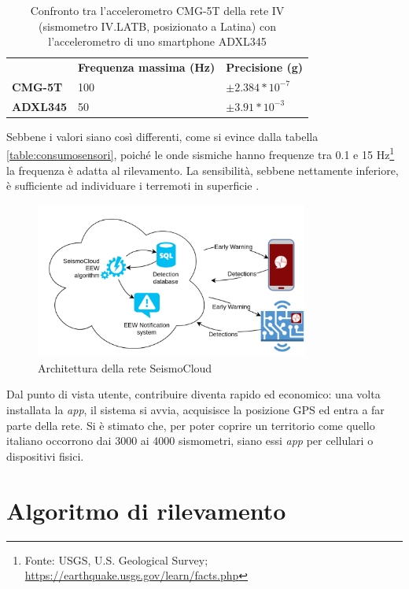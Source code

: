 \documentclass[a4paper,10pt]{memoir}
\begin{document}
\begin{table}[h]
\centering
\caption{Confronto tra l'accelerometro CMG-5T della rete IV (sismometro IV.LATB, posizionato a Latina) con l'accelerometro di uno smartphone ADXL345}
\label{table:datisensori}
\begin{tabular}{lll}
                    & \textbf{Frequenza massima (Hz)} & \textbf{Precisione (g)} \\
\textbf{CMG-5T} \cite{ivlatb} & 100 & $\pm 2.384 * 10^{-7}$ \\
\textbf{ADXL345} \cite{accelman}          & 50 & $\pm 3.91 * 10^{-3}$
\end{tabular}
\end{table}

Sebbene i valori siano così differenti, come si evince dalla tabella \ref{table:consumosensori}, poiché le onde sismiche hanno frequenze tra 0.1 e 15 Hz\footnote{Fonte: USGS, U.S. Geological Survey; \url{https://earthquake.usgs.gov/learn/facts.php}} la frequenza è adatta al rilevamento. La sensibilità, sebbene nettamente inferiore, è sufficiente ad individuare i terremoti in superficie \cite{finazzi}.

\begin{figure}[ht]
\centering
\label{fig:scsarch}
\caption{Architettura della rete SeismoCloud}
\includegraphics[width=0.8\textwidth]{introduzione/SeismoCloud_arch}
\end{figure}

Dal punto di vista utente, contribuire diventa rapido ed economico: una volta installata la \textit{app}, il sistema si avvia, acquisisce la posizione GPS ed entra a far parte della rete. Si è stimato che, per poter coprire un territorio come quello italiano occorrono dai 3000 ai 4000 sismometri, siano essi \textit{app} per cellulari o dispositivi fisici.

\section{Algoritmo di rilevamento}
\label{section:algoritmo}
\end{document}
